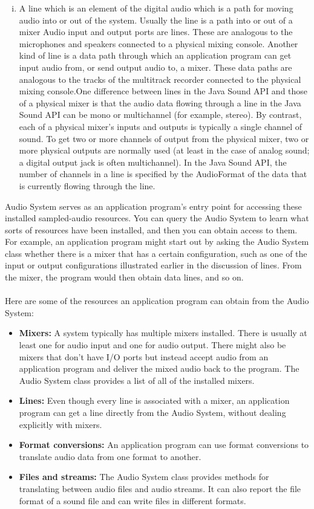 \begin{enumerate}[(i)]
        \item A line which is an element of the digital audio which is a path for moving audio into or out of the system. Usually the line is a path into or out of a mixer Audio input and output ports are lines. These are analogous to the microphones and speakers connected to a physical mixing console. Another kind of line is a data path through which an application program can get input audio from, or send output audio to, a mixer. These data paths are analogous to the tracks of the multitrack recorder connected to the physical mixing console.One difference between lines in the Java Sound API and those of a physical mixer is that the audio data flowing through a line in the Java Sound API can be mono or multichannel (for example, stereo). By contrast, each of a physical mixer's inputs and outputs is typically a single channel of sound. To get two or more channels of output from the physical mixer, two or more physical outputs are normally used (at least in the case of analog sound; a digital output jack is often multichannel). In the Java Sound API, the number of channels in a line is specified by the AudioFormat of the data that is currently flowing through the line.
\end{enumerate}
Audio System serves as an application program's entry point for accessing these installed sampled-audio resources. You can query the Audio System to learn what sorts of resources have been installed, and then you can obtain access to them. For example, an application program might start out by asking the Audio System class whether there is a mixer that has a certain configuration, such as one of the input or output configurations illustrated earlier in the discussion of lines. From the mixer, the program would then obtain data lines, and so on.\\
\\
Here are some of the resources an application program can obtain from the Audio System:
\begin{itemize}
        \item \textbf{Mixers:} A system typically has multiple mixers installed. There is usually at least one for audio input and one for audio output. There might also be mixers that don't have I/O ports but instead accept audio from an application program and deliver the mixed audio back to the program. The Audio System class provides a list of all of the installed mixers.
        \item \textbf{Lines:} Even though every line is associated with a mixer, an application program can get a line directly from the Audio System, without dealing explicitly with mixers.
        \item \textbf{Format conversions:} An application program can use format conversions to translate audio data from one format to another.
        \item \textbf{Files and streams:} The Audio System class provides methods for translating between audio files and audio streams. It can also report the file format of a sound file and can write files in different formats.
\end{itemize}

